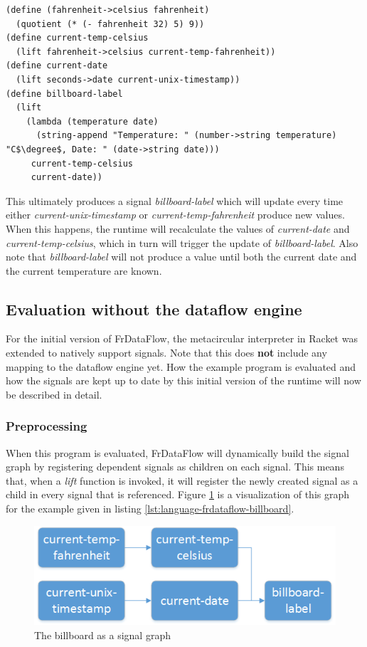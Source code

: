 \begin{lstlisting}[caption={Billboard},captionpos=b,label={lst:language-frdataflow-billboard},mathescape,language=FrDataFlow]
(define (fahrenheit->celsius fahrenheit)
  (quotient (* (- fahrenheit 32) 5) 9))
(define current-temp-celsius
  (lift fahrenheit->celsius current-temp-fahrenheit))
(define current-date
  (lift seconds->date current-unix-timestamp))
(define billboard-label
  (lift
    (lambda (temperature date)
      (string-append "Temperature: " (number->string temperature) "C$\degree$, Date: " (date->string date)))
     current-temp-celsius
     current-date))   
\end{lstlisting}
This ultimately produces a signal \textit{billboard-label} which will update every time either \textit{current-unix-timestamp} or \textit{current-temp-fahrenheit} produce new values. When this happens, the runtime will recalculate the values of \textit{current-date} and \textit{current-temp-celsius}, which in turn will trigger the update of \textit{billboard-label}. Also note that \textit{billboard-label} will not produce a value until both the current date and the current temperature are known. 

\subsection{Evaluation without the dataflow engine}

For the initial version of FrDataFlow, the metacircular interpreter in Racket was extended to natively support signals. Note that this does \textbf{not} include any mapping to the dataflow engine yet. 
How the example program is evaluated and how the signals are kept up to date by this initial version of the runtime will now be described in detail. 
 
\subsubsection{Preprocessing}

When this program is evaluated, FrDataFlow will dynamically build the signal graph by registering dependent signals as children on each signal. This means that, when a \textit{lift} function is invoked, it will register the newly created signal as a child in every signal that is referenced. Figure \ref{fig:language-frdataflow-example} is a visualization of this graph for the example given in listing \ref{lst:language-frdataflow-billboard}.

\begin{figure}[h]
	\centerline{\includegraphics[width=\textwidth]{images/Language-FrDataflow-Example.png}}
	\caption{The billboard as a signal graph}
	\label{fig:language-frdataflow-example}
\end{figure}

